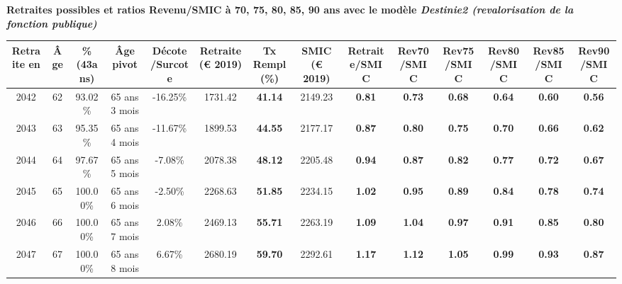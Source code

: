  \vspace{0.1cm} 
{\bf \noindent Retraites possibles et ratios Revenu/SMIC à 70, 75, 80, 85, 90 ans avec le modèle \emph{Destinie2 (revalorisation de la fonction publique)}}  
 
\begin{adjustbox}{max width=\textwidth} 
\begin{tabular}[htb]{|c|c||c|c|c||c|c||c||c|c|c|c|c|c|} 
\hline 
 Retraite en &  Âge &  \%(43ans) &  Âge pivot &  Décote/Surcote &  Retraite (\euro{} 2019) &  Tx Rempl(\%) &  SMIC (\euro{} 2019) &  Retraite/SMIC &  Rev70/SMIC &  Rev75/SMIC &  Rev80/SMIC &  Rev85/SMIC &  Rev90/SMIC \\ 
\hline \hline 
 2042 &  62 &  93.02\% &  65 ans 3 mois &  -16.25\% &  1731.42 &  {\bf 41.14} &  2149.23 &  {\bf {\color{red} 0.81}} &  {\bf {\color{red} 0.73}} &  {\bf {\color{red} 0.68}} &  {\bf {\color{red} 0.64}} &  {\bf {\color{red} 0.60}} &  {\bf {\color{red} 0.56}} \\ 
\hline 
 2043 &  63 &  95.35\% &  65 ans 4 mois &  -11.67\% &  1899.53 &  {\bf 44.55} &  2177.17 &  {\bf {\color{red} 0.87}} &  {\bf {\color{red} 0.80}} &  {\bf {\color{red} 0.75}} &  {\bf {\color{red} 0.70}} &  {\bf {\color{red} 0.66}} &  {\bf {\color{red} 0.62}} \\ 
\hline 
 2044 &  64 &  97.67\% &  65 ans 5 mois &  -7.08\% &  2078.38 &  {\bf 48.12} &  2205.48 &  {\bf {\color{red} 0.94}} &  {\bf {\color{red} 0.87}} &  {\bf {\color{red} 0.82}} &  {\bf {\color{red} 0.77}} &  {\bf {\color{red} 0.72}} &  {\bf {\color{red} 0.67}} \\ 
\hline 
 2045 &  65 &  100.00\% &  65 ans 6 mois &  -2.50\% &  2268.63 &  {\bf 51.85} &  2234.15 &  {\bf 1.02} &  {\bf {\color{red} 0.95}} &  {\bf {\color{red} 0.89}} &  {\bf {\color{red} 0.84}} &  {\bf {\color{red} 0.78}} &  {\bf {\color{red} 0.74}} \\ 
\hline 
 2046 &  66 &  100.00\% &  65 ans 7 mois &  2.08\% &  2469.13 &  {\bf 55.71} &  2263.19 &  {\bf 1.09} &  {\bf 1.04} &  {\bf {\color{red} 0.97}} &  {\bf {\color{red} 0.91}} &  {\bf {\color{red} 0.85}} &  {\bf {\color{red} 0.80}} \\ 
\hline 
 2047 &  67 &  100.00\% &  65 ans 8 mois &  6.67\% &  2680.19 &  {\bf 59.70} &  2292.61 &  {\bf 1.17} &  {\bf 1.12} &  {\bf 1.05} &  {\bf {\color{red} 0.99}} &  {\bf {\color{red} 0.93}} &  {\bf {\color{red} 0.87}} \\ 
\hline 
\hline 
\end{tabular} 
\end{adjustbox} 
 
